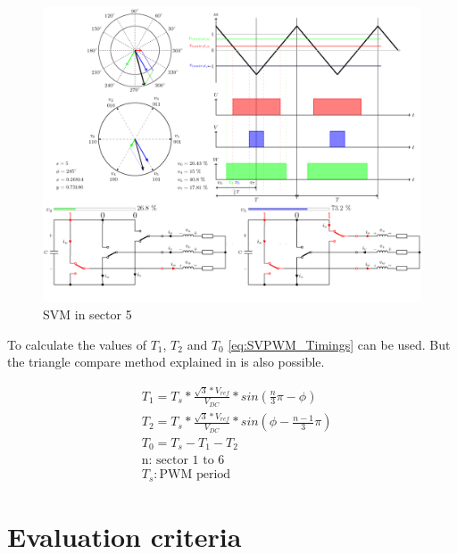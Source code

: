 \documentclass[]{report}
\begin{document}
\begin{figure}[H]
	\centering
	\includegraphics[width=\linewidth]{SVPWM-5.png}
	\caption{SVM in sector 5 \cite{SVPWM_animations}}
	\label{fig:SvmInSector5}
\end{figure}

To calculate the values of $T_1$, $T_2$ and $T_0$ \autoref{eq:SVPWM_Timings} \cite{SVPWM_calculations} can be used. But the triangle compare method explained in \cite{SVPWM_animations} is also possible.

\begin{equation} \label{eq:SVPWM_Timings}
	\begin{split}
		&T_1 = T_s*\frac{\sqrt{3}*V_{ref}}{V_{DC}}*sin(\frac{n}{3}\pi - \phi) \\
		&T_2 = T_s*\frac{\sqrt{3}*V_{ref}}{V_{DC}}*sin(\phi - \frac{n-1}{3}\pi) \\
		&T_0 = T_s - T_1 - T_2 \\
		&\text{n: sector 1 to 6} \\
		&T_s: \text{PWM period}		
	\end{split}
\end{equation}
 

\chapter{Evaluation criteria}
\end{document}
